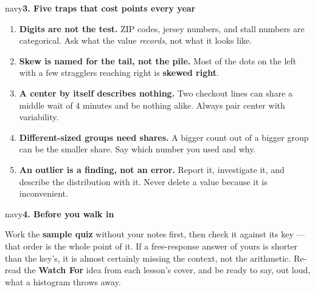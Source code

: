\documentclass[12pt]{article}
\newcommand{\sghead}[1]{%
  \vspace{0.13in}
  \boxguard[10]
  \begin{headlinebox}{navy}\color{white}\bfseries\small #1\end{headlinebox}
  \vspace{0.09in}}
\begin{document}
\sghead{3. Five traps that cost points every year}

\small
\begin{enumerate}[leftmargin=1.6em, itemsep=5pt]
  \item \textbf{Digits are not the test.} ZIP codes, jersey numbers, and stall numbers are
        categorical. Ask what the value \emph{records}, not what it looks like.
  \item \textbf{Skew is named for the tail, not the pile.} Most of the dots on the left with a
        few stragglers reaching right is \textbf{skewed right}.
  \item \textbf{A center by itself describes nothing.} Two checkout lines can share a middle wait
        of 4 minutes and be nothing alike. Always pair center with variability.
  \item \textbf{Different-sized groups need shares.} A bigger count out of a bigger group can be
        the smaller share. Say which number you used and why.
  \item \textbf{An outlier is a finding, not an error.} Report it, investigate it, and describe
        the distribution with it. Never delete a value because it is inconvenient.
\end{enumerate}
\normalsize

\sghead{4. Before you walk in}

\small
Work the \textbf{sample quiz} without your notes first, then check it against its key --- that
order is the whole point of it. If a free-response answer of yours is shorter than the key's, it
is almost certainly missing the context, not the arithmetic. Re-read the \textbf{Watch For} idea
from each lesson's cover, and be ready to say, out loud, what a histogram throws away.
\normalsize
\end{document}
